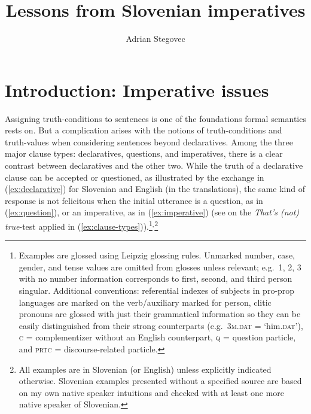 \documentclass[output=paper,colorlinks,citecolor=brown]{langscibook}
\author{Adrian Stegovec\orcid{0000-0002-7317-1025}\affiliation{University of Connecticut}}
\title{Lessons from Slovenian imperatives}
\begin{document}
\maketitle
\section{Introduction: Imperative issues}
\label{steg:sec:intro}
\largerpage

Assigning truth-conditions to sentences is one of the foundations formal semantics rests on. But a complication arises with the notions of truth-conditions and truth-values when considering sentences beyond declaratives. Among the three major clause types: declaratives, questions, and imperatives, there is a clear contrast between declaratives and the other two. While the truth of a declarative clause can be accepted or questioned, as illustrated by the exchange in (\ref{ex:declarative}) for Slovenian and English (in the translations), the same kind of response is not felicitous when the initial utterance is a question, as in (\ref{ex:question}), or an imperative, as in (\ref{ex:imperative}) (see \cite[][4.3]{kaufmannBOOK} on the \emph{That's (not) true}-test applied in (\ref{ex:clause-types})).\footnote{Examples are glossed using Leipzig glossing rules. Unmarked number, case, gender, and tense values are omitted from glosses unless relevant; e.g.\ 1, 2, 3 with no number information corresponds to first, second, and third person singular. Additional conventions: referential indexes of subjects in pro-prop languages are marked on the verb/auxiliary marked for person, clitic pronouns are glossed with just their grammatical information so they can be easily distinguished from their strong counterparts (e.g.\ \textsc{3m.dat} = `him.\textsc{dat}'), \textsc{c} = complementizer without an English counterpart, \textsc{q} = question particle, and \textsc{prtc} = discourse-related particle.}$^,$\footnote{All examples are in Slovenian (or English) unless explicitly indicated otherwise. Slovenian examples presented without a specified source are based on my own native speaker intuitions and checked with at least one more native speaker of Slovenian.}  
\end{document}
